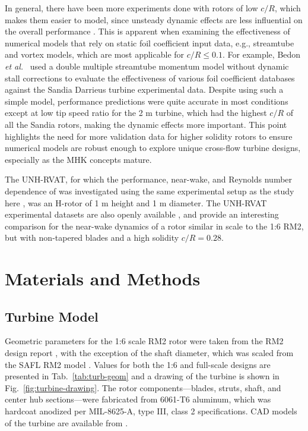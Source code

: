 \documentclass[10pt,letterpaper]{article}
\begin{document}
In general, there have been more experiments done with rotors of low $c/R$,
which makes them easier to model, since unsteady dynamic effects are less
influential on the overall performance \cite{Strickland1981}. This is apparent
when examining the effectiveness of numerical models that rely on static foil
coefficient input data, e.g., streamtube and vortex models, which are most
applicable for $c/R \leq 0.1$. For example, Bedon \emph{et al.}~\cite{Bedon2014}
used a double multiple streamtube momentum model without dynamic stall
corrections to evaluate the effectiveness of various foil coefficient databases
against the Sandia Darrieus turbine experimental data. Despite using such a
simple model, performance predictions were quite accurate in most conditions
except at low tip speed ratio for the 2 m turbine, which had the highest $c/R$
of all the Sandia rotors, making the dynamic effects more important. This point
highlights the need for more validation data for higher solidity rotors to
ensure numerical models are robust enough to explore unique cross-flow turbine
designs, especially as the MHK concepts mature.

The UNH-RVAT, for which the performance, near-wake, and Reynolds number
dependence of was investigated using the same experimental setup as the study
here \cite{Bachant2015-JoT, Bachant2016-Energies}, was an H-rotor of 1 m height
and 1 m diameter. The UNH-RVAT experimental datasets are also openly available
\cite{Bachant2014-RVAT-baseline, Bachant2016-RVAT-Re-dep}, and provide an
interesting comparison for the near-wake dynamics of a rotor similar in scale to
the 1:6 RM2, but with non-tapered blades and a high solidity $c/R = 0.28$.


\section*{Materials and Methods}

\subsection*{Turbine Model}

Geometric parameters for the 1:6 scale RM2 rotor were taken from the RM2 design
report \cite{Barone2011}, with the exception of the shaft diameter, which was
scaled from the SAFL RM2 model \cite{Hill2014}. Values for both the 1:6 and
full-scale designs are presented in Tab.~\ref{tab:turb-geom} and a drawing of
the turbine is shown in Fig.~\ref{fig:turbine-drawing}. The rotor
components---blades, struts, shaft, and center hub sections---were fabricated
from 6061-T6 aluminum, which was hardcoat anodized per MIL-8625-A, type III,
class 2 specifications. CAD models of the turbine are available from
\cite{Bachant2015-RM2-CAD}.
\end{document}
